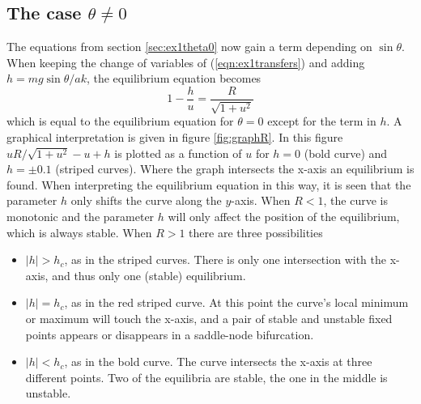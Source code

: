 \subsection{The case $\theta \ne 0$}\label{sec:ex1thetane0}
The equations from section \ref{sec:ex1theta0} now gain a term depending on $\sin{\theta}$. When keeping the change of variables of (\ref{eqn:ex1transfers}) and adding $h=mg\sin{\theta}/ak$, the equilibrium equation becomes
\begin{equation}\label{eqn:ex1eqbreq}
1-\frac{h}{u}=\frac{R}{\sqrt{1+u^2}}
\end{equation}
which is equal to the equilibrium equation for $\theta=0$ except for the term in $h$. A graphical interpretation is given in figure \ref{fig:graphR}. In this figure $uR/\sqrt{1+u^2}-u+h$ is plotted as a function of $u$ for $h=0$ (bold curve) and $h=\pm0.1$ (striped curves). Where the graph intersects the x-axis an equilibrium is found. When interpreting the equilibrium equation in this way, it is seen that the parameter $h$ only shifts the curve along the $y$-axis. When $R<1$, the curve is monotonic and the parameter $h$ will only affect the position of the equilibrium, which is always stable. When $R>1$ there are three possibilities
\begin{itemize}
\item $|h|>h_c$, as in the striped curves. There is only one intersection with the x-axis, and thus only one (stable) equilibrium.
\item $|h|=h_c$, as in the red striped curve. At this point the curve's local minimum or maximum will touch the x-axis, and a pair of stable and unstable fixed points appears or disappears in a saddle-node bifurcation.
\item $|h|<h_c$, as in the bold curve. The curve intersects the x-axis at three different points. Two of the equilibria are stable, the one in the middle is unstable.
\end{itemize}
